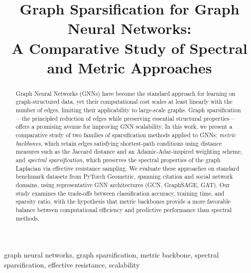 \documentclass[conference]{IEEEtran}
\begin{document}
\title{Graph Sparsification for Graph Neural Networks:\\A Comparative Study of Spectral and Metric Approaches}

\author{
\and
{}
}

\maketitle

\begin{abstract}
Graph Neural Networks (GNNs) have become the standard approach for learning on graph-structured data, yet their computational cost scales at least linearly with the number of edges, limiting their applicability to large-scale graphs. Graph sparsification---the principled reduction of edges while preserving essential structural properties---offers a promising avenue for improving GNN scalability. In this work, we present a comparative study of two families of sparsification methods applied to GNNs: \emph{metric backbones}, which retain edges satisfying shortest-path conditions using distance measures such as the Jaccard distance and an Adamic-Adar-inspired weighting scheme, and \emph{spectral sparsification}, which preserves the spectral properties of the graph Laplacian via effective resistance sampling. We evaluate these approaches on standard benchmark datasets from PyTorch Geometric, spanning citation and social network domains, using representative GNN architectures (GCN, GraphSAGE, GAT). Our study examines the trade-offs between classification accuracy, training time, and sparsity ratio, with the hypothesis that metric backbones provide a more favorable balance between computational efficiency and predictive performance than spectral methods.
\end{abstract}

\begin{IEEEkeywords}
graph neural networks, graph sparsification, metric backbone, spectral sparsification, effective resistance, scalability
\end{IEEEkeywords}
\end{document}
